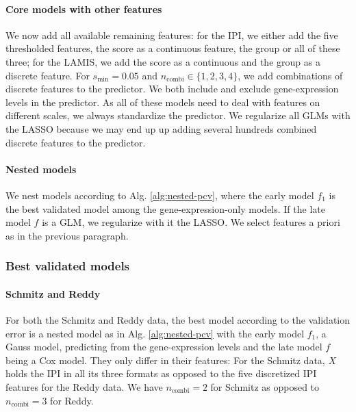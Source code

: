 \paragraph{Core models with other features}
We now add all available remaining features: for the 
IPI, we either add the five thresholded features, the score as a continuous feature, the group or 
all of these three; for the LAMIS, %
we add the score as a continuous and the group as a discrete feature. For $s_\text{min} = \num{0.05}$ 
and $n_\text{combi} \in \{1, 2, 3, 4 \}$, we add combinations of discrete features to the predictor. 
We both include and exclude gene-expression levels in the predictor.
As all of these models need to deal with features on different scales, we always 
standardize the predictor. We regularize all GLMs with the LASSO because we may end up up adding 
several hundreds combined discrete features to the predictor.

\paragraph{Nested models}
We nest models according to Alg. \ref{alg:nested-pcv}, where the early model $f_1$ is the best 
validated model among the gene-expression-only models. If the late model $f$ is a GLM,
we regularize with it the LASSO. We select features a priori as in the previous 
paragraph.

\subsubsection{Best validated models}

\paragraph{Schmitz and Reddy}
For both the Schmitz and Reddy data, the best model according to the validation error is a nested 
model as in Alg. \ref{alg:nested-pcv} with the early model $f_1$, a Gauss model, predicting from 
the gene-expression levels and the late model $f$ being a Cox model. They only differ in their 
features: For the Schmitz data, $X$ holds the IPI in all its three formats as opposed to the five 
discretized IPI features for the Reddy data. We have $n_\text{combi} = 2$ for Schmitz as opposed to 
$n_\text{combi} = 3$ for Reddy.

